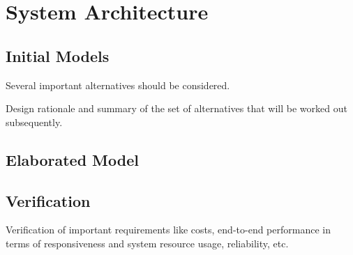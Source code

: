 \chapter{System Architecture}

\section{Initial Models}

Several important alternatives should be considered.

Design rationale and summary of the set of alternatives that will be worked out subsequently.

\section{Elaborated Model}

\section{Verification}

Verification of important requirements like costs, end-to-end performance in terms of responsiveness and system resource usage, reliability, etc.
